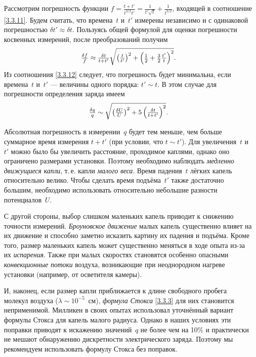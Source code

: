 Рассмотрим погрешность функции
$f=\frac{t+t'}{t^{3/2}t'} = \frac{1}{t'\sqrt{t}} + \frac{1}{t^{3/2}}$,
входящей в соотношение \eqref{3.3.11}.
Будем считать, что времена~$t$ и~$t'$ 
измерены независимо и с одинаковой погрешностью $\delta {t'}\approx \delta t$.
Пользуясь общей формулой для оценки погрешности косвенных 
измерений, после преобразований получим
\begin{equation}
\tfrac{\delta f}{f} \approx 
\tfrac{\delta t}{t+t'} 
\sqrt{\left(\tfrac{t}{t'} \right)^2 + 
    \left(\tfrac12 + \tfrac32 \tfrac{t'}{t}\right)^2}.
\eqmark{3.3.12}
\end{equation}
Из соотношения \eqref{3.3.12} следует, что погрешность будет минимальна, 
если времена~$t$ и~$t'$ --- величины одного порядка: $t'\sim t$.
В этом случае для погрешности определения заряда имеем
\begin{equation}
	\tfrac{\delta q}{q} \sim 
    \sqrt{\left(\tfrac{\delta U}{U}\right)^2 + 5 \left(\tfrac{\delta t}{t+t'}\right)^2}.
	\eqmark{3.3.13}
\end{equation}

Абсолютная погрешность в измерении~$q$ будет тем меньше, 
чем больше суммарное время измерения $t+t'$ (при условии, что $t\sim t'$). 
Для увеличения~$t$ и~$t'$ можно было бы увеличить
расстояние, проходимое каплями, однако оно ограничено размерами установки. 
Поэтому необходимо наблюдать \emph{медленно движущиеся капли}, т.\,е. 
капли \emph{малого веса}. 
Время падения~$t$ лёгких капель относительно велико. 
Чтобы сделать время подъёма~$t'$ также достаточно большим, необходимо
использовать относительно небольшие разности потенциалов~$U$.

С другой стороны, выбор слишком маленьких капель приводит к снижению точности
измерений. \emph{Броуновское движение} малых капель существенно влияет на
их движение и способно заметно исказить картину их падения и подъёма. 
Кроме того, размер маленьких капель может существенно меняться
в ходе опыта из-за их \emph{испарения}. 
Также при малых скоростях становятся особенно 
опасными \emph{конвекционные потоки} воздуха, возникающие при неоднородном нагреве
установки (например, от осветителя камеры). 

И, наконец, если размер капли приближается к длине свободного пробега
молекул воздуха ($\lambda \sim 10^{-5}$~см), \emph{формула Стокса} \eqref{3.3.3}
для них становится неприменимой. 
Милликен в своих опытах использовал уточнённый вариант формулы Стокса 
для капель малого радиуса. 
Однако в наших условиях эти поправки приводят к искажению значений~$q$ не более
чем на 10\% и практически не мешают обнаружению дискретности электрического заряда. 
Поэтому мы рекомендуем использовать формулу Стокса без поправок.

